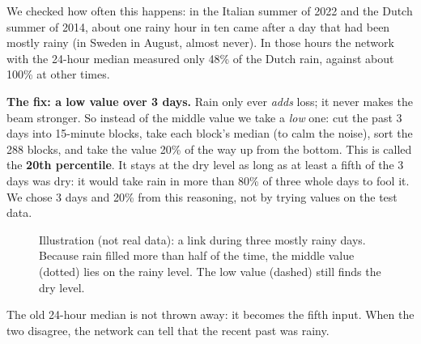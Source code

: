 We checked how often this happens: in the Italian summer of 2022 and the Dutch summer of 2014, about one rainy hour in
ten came after a day that had been mostly rainy (in Sweden in August, almost never). In those hours the network with
the 24-hour median measured only 48\% of the Dutch rain, against about 100\% at other times.

\textbf{The fix: a low value over 3 days.} Rain only ever \emph{adds} loss; it never makes the beam stronger. So
instead of the middle value we take a \emph{low} one: cut the past 3 days into 15-minute blocks, take each block's
median (to calm the noise), sort the 288 blocks, and take the value 20\% of the way up from the bottom. This is called
the \textbf{20th percentile}. It stays at the dry level as long as at least a fifth of the 3 days was dry: it would
take rain in more than 80\% of three whole days to fool it. We chose 3 days and 20\% from this reasoning, not by trying
values on the test data.

\begin{figure}[h]
\centering
{}
\caption{Illustration (not real data): a link during three mostly rainy days. Because rain filled more than half of the
time, the middle value (dotted) lies on the rainy level. The low value (dashed) still finds the dry level.}
\label{fig:drylevel}
\end{figure}

The old 24-hour median is not thrown away: it becomes the fifth input. When the two disagree, the network can tell that
the recent past was rainy.

